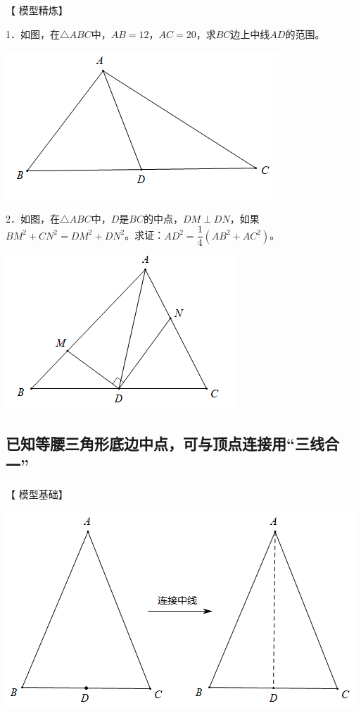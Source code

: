 \documentclass[10pt]{ctexart}
\begin{document}
【 {\heiti 模型精炼}】
\begin{shaded}
	1．如图，在$\triangle ABC$中，$AB=12$，$AC=20$，求$BC$边上中线$AD$的范围。
\end{shaded}

\begin{flushright}
	\includegraphics[scale=0.6]{figure/zhongdian05}
\end{flushright}

\begin{shaded}
  	2．如图，在$\triangle ABC$中，$D$是$BC$的中点，$DM\perp DN$，如果$BM^2+CN^2=DM^2+DN^2$。求证：$AD^2=\dfrac{1}{4}\left(AB^2+AC^2\right)$。
\end{shaded}

\begin{flushright}
	\includegraphics[scale=0.6]{figure/zhongdian06}
\end{flushright}


\subsection{已知等腰三角形底边中点，可与顶点连接用“三线合一”}

【 {\heiti 模型基础}】

\begin{center}
	\includegraphics[scale=0.6]{figure/zhongdian07}
\end{center}
\end{document}
